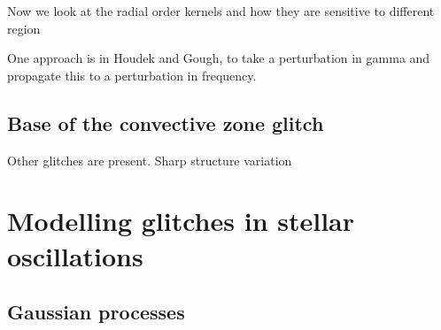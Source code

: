 Now we look at the radial order kernels and how they are sensitive to different region


One approach is in Houdek and Gough, to take a perturbation in gamma and propagate this to a perturbation in frequency.

\subsection{Base of the convective zone glitch}\label{sec:bcz-glitch}

Other glitches are present. Sharp structure variation

\section[Modelling the glitch]{Modelling glitches in stellar oscillations}


\subsection{Gaussian processes }\label{sec:glitch-gp}

